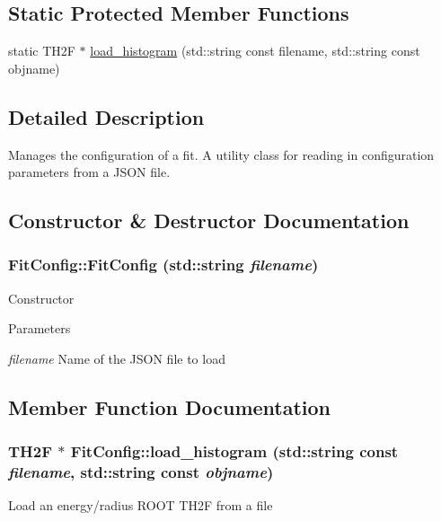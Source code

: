 \subsection*{Static Protected Member Functions}
\begin{DoxyCompactItemize}
\item 
static TH2F $\ast$ \hyperlink{classFitConfig_aa537cd3862464cad2927f418fc96dded}{load\_\-histogram} (std::string const filename, std::string const objname)
\end{DoxyCompactItemize}


\subsection{Detailed Description}
Manages the configuration of a fit. A utility class for reading in configuration parameters from a JSON file. 

\subsection{Constructor \& Destructor Documentation}
\hypertarget{classFitConfig_af452a95ad4416b08111cffd41e2c8f5a}{
\subsubsection[{FitConfig}]{\setlength{\rightskip}{0pt plus 5cm}FitConfig::FitConfig (std::string {\em filename})}}
\label{classFitConfig_af452a95ad4416b08111cffd41e2c8f5a}
Constructor


\begin{DoxyParams}{Parameters}
\item[{\em filename}]Name of the JSON file to load \end{DoxyParams}


\subsection{Member Function Documentation}
\hypertarget{classFitConfig_aa537cd3862464cad2927f418fc96dded}{
\subsubsection[{load\_\-histogram}]{\setlength{\rightskip}{0pt plus 5cm}TH2F $\ast$ FitConfig::load\_\-histogram (std::string const  {\em filename}, \/  std::string const  {\em objname})}}
\label{classFitConfig_aa537cd3862464cad2927f418fc96dded}
Load an energy/radius ROOT TH2F from a file


